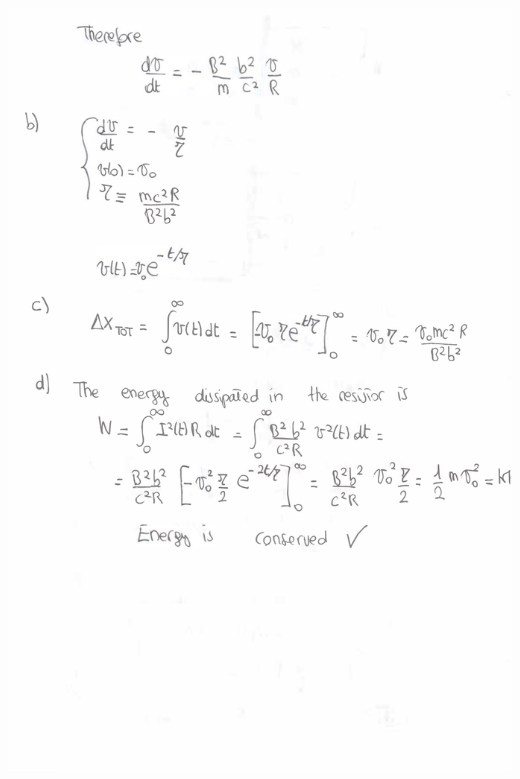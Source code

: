 \documentclass[makesolutionspdf]{esg8022pset}
\begin{document}
\begin{solution}
\begin{center}
    \includegraphics[width = \textwidth, height = 0.9\textheight, keepaspectratio]{ps9_2b}
  \end{center}
\end{solution}

\end{document}
